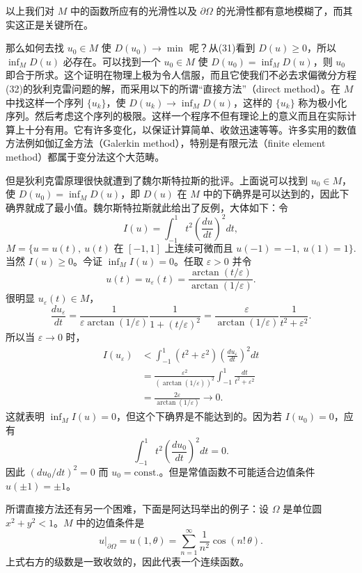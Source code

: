 以上我们对 $M$ 中的函数所应有的光滑性以及 $\partial\Omega$ 的光滑性都有意地模糊了，而其实这正是关键所在。

那么如何去找 $u_0\in M$ 使 $D(u_0)\to\min$ 呢？从(31)看到 $D(u)\ge0$，所以 $\inf_M D(u)$ 必存在。可以找到一个 $u_0\in M$ 使 $D(u_0)=\inf_M D(u)$，则 $u_0$ 即合于所求。这个证明在物理上极为令人信服，而且它使我们不必去求偏微分方程(32)的狄利克雷问题的解，而采用以下的所谓“直接方法”（direct method）。在 $M$ 中找这样一个序列 $\{u_k\}$，使 $D(u_k)\to\inf_M D(u)$，这样的 $\{u_k\}$ 称为极小化序列。然后考虑这个序列的极限。这样一个程序不但有理论上的意义而且在实际计算上十分有用。它有许多变化，以保证计算简单、收敛迅速等等。许多实用的数值方法例如伽辽金方法（Galerkin method），特别是有限元法（finite element method）都属于变分法这个大范畴。

但是狄利克雷原理很快就遭到了魏尔斯特拉斯的批评。上面说可以找到 $u_0\in M$，使 $D(u_0)=\inf_M D(u)$，即 $D(u)$ 在 $M$ 中的下确界是可以达到的，因此下确界就成了最小值。魏尔斯特拉斯就此给出了反例，大体如下：令
\[
 I(u)=\int_{-1}^{1} t^2\left(\frac{du}{dt}\right)^2dt,
\]
\[
 M=\{u=u(t),\ u(t)\text{ 在 }[-1,1]\text{ 上连续可微而且 }u(-1)=-1,\ u(1)=1\}.
\]
当然 $I(u)\ge0$。今证 $\inf_M I(u)=0$。任取 $\varepsilon>0$ 并令
\[
 u(t)=u_\varepsilon(t)
 =\frac{\arctan(t/\varepsilon)}{\arctan(1/\varepsilon)}.
\]
很明显 $u_\varepsilon(t)\in M$，
\[
 \frac{du_\varepsilon}{dt}
 =\frac1{\varepsilon\arctan(1/\varepsilon)}
 \frac1{1+(t/\varepsilon)^2}
 =\frac{\varepsilon}{\arctan(1/\varepsilon)}\frac1{t^2+\varepsilon^2}.
\]
所以当 $\varepsilon\to0$ 时，
\begin{align*}
 I(u_\varepsilon)
 &<\int_{-1}^{1}(t^2+\varepsilon^2)\left(\frac{du_\varepsilon}{dt}\right)^2dt\\
 &=\frac{\varepsilon^2}{(\arctan(1/\varepsilon))^2}
 \int_{-1}^{1}\frac{dt}{t^2+\varepsilon^2}\\
 &=\frac{2\varepsilon}{\arctan(1/\varepsilon)}\to0.
\end{align*}
这就表明 $\inf_M I(u)=0$，但这个下确界是不能达到的。因为若 $I(u_0)=0$，应有
\[
 \int_{-1}^{1}t^2\left(\frac{du_0}{dt}\right)^2dt=0.
\]
因此 $(du_0/dt)^2=0$ 而 $u_0=\mathrm{const.}$。但是常值函数不可能适合边值条件 $u(\pm1)=\pm1$。

所谓直接方法还有另一个困难，下面是阿达玛举出的例子：设 $\Omega$ 是单位圆 $x^2+y^2<1$。$M$ 中的边值条件是
\begin{equation}
 u|_{\partial\Omega}=u(1,\theta)=\sum_{n=1}^{\infty}\frac1{n^2}\cos(n!\,\theta).
 \tag{33}
\end{equation}
上式右方的级数是一致收敛的，因此代表一个连续函数。

